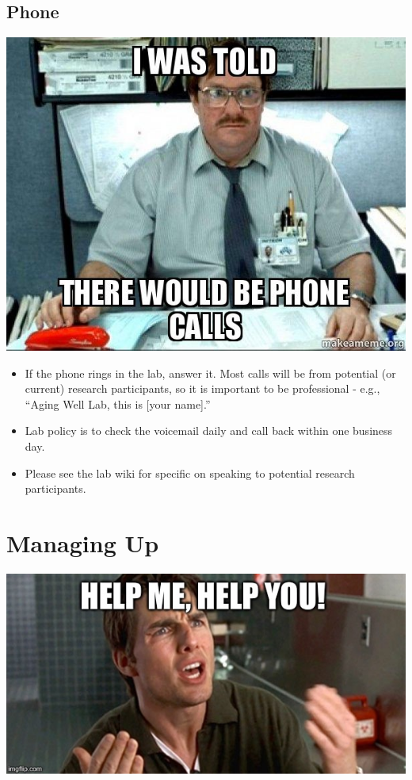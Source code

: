 \documentclass[
]{book}
\begin{document}
\hypertarget{phone}{%
\subsection{Phone}\label{phone}}

\includegraphics{images/phonecalls.jpg}

\begin{itemize}
\item
  If the phone rings in the lab, answer it. Most calls will be from potential (or current) research participants, so it is important to be professional - e.g., ``Aging Well Lab, this is {[}your name{]}.''
\item
  Lab policy is to check the voicemail daily and call back within one business day.
\item
  Please see the lab wiki for specific on speaking to potential research participants.
\end{itemize}

\hypertarget{managing-up}{%
\section{Managing Up}\label{managing-up}}

\includegraphics{images/helpme.jpeg}
\end{document}
